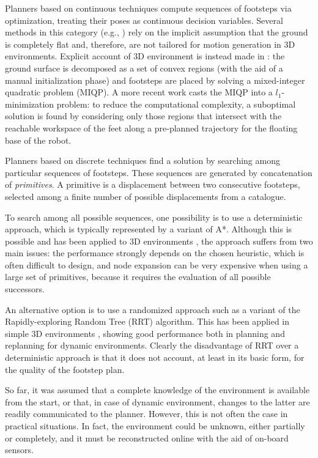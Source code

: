 Planners based on continuous techniques compute sequences of footsteps via optimization, treating their poses as continuous decision variables. 
Several methods in this category (e.g., \cite{IbBiPa:14, Hong_2011TSMC, Kasadei2021SNAS}) rely on the implicit assumption that the ground is completely flat and, therefore, are not tailored for motion generation in 3D environments.
Explicit account of 3D environment is instead made in \cite{DeTe:14}: the ground surface is decomposed as a set of convex regions (with the aid of a manual initialization phase) and footsteps are placed by solving a mixed-integer quadratic problem (MIQP). 
A more recent work \cite{Song_RAL2021} casts the MIQP into a $l_1$-minimization problem: 
to reduce the computational complexity, a suboptimal solution is found by considering only those regions that intersect with the reachable workspace of the feet along a pre-planned trajectory for the floating base of the robot.

Planners based on discrete techniques find a solution by searching among particular sequences of footsteps. These sequences are generated by concatenation of \emph{primitives}. A primitive is a displacement between two consecutive footsteps, selected among a finite number of possible displacements from a catalogue.

To search among all possible sequences, one possibility is to use a deterministic approach, which is typically represented by a variant of A*. Although this is possible and has been applied to 3D environments \cite{Griffin_ICRA2019}, the approach suffers from two main issues: the performance strongly depends on the chosen heuristic, which is often difficult to design, and node expansion can be very expensive when using a large set of primitives, because it requires the evaluation of all possible successors.

An alternative option is to use a randomized approach such as a variant of the Rapidly-exploring Random Tree (RRT) algorithm. 
This has been applied in simple 3D environments \cite{Liu_IROS2012}, showing good performance both in planning and replanning for dynamic environments. Clearly the disadvantage of RRT over a deterministic approach is that it does not account, at least in its basic form, for the quality of the footstep plan.

So far, it was assumed that a complete knowledge of the environment is available from the start, or that, in case of dynamic environment, changes to the latter are readily communicated to the planner. However, this is not often the case in practical situations. In fact, the environment could be unknown, either partially or completely, and it must be reconstructed online with the aid of on-board sensors.

